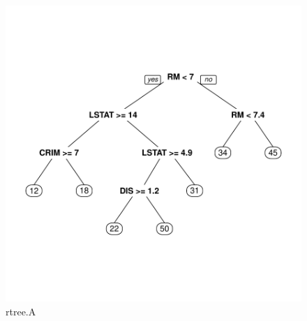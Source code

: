 \documentclass{article}
\begin{document}
\begin{figure}
\begin{center}
\includegraphics{Assignment4a-005}
\end{center}
\caption{rtree.A}
\label{rtree:A}
\end{figure}
\end{document}
